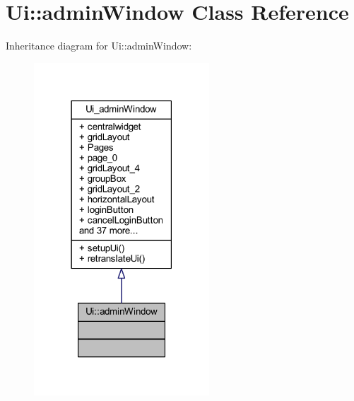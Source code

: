 \hypertarget{class_ui_1_1admin_window}{}\section{Ui\+:\+:admin\+Window Class Reference}
\label{class_ui_1_1admin_window}


Inheritance diagram for Ui\+:\+:admin\+Window\+:\nopagebreak
\begin{figure}[H]
\begin{center}
\leavevmode
\includegraphics[width=186pt]{class_ui_1_1admin_window__inherit__graph}
\end{center}
\end{figure}


